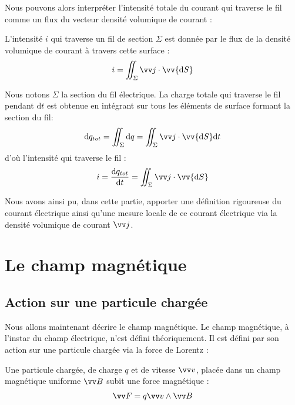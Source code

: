 \documentclass[11pt,fleqn]{book} %
\newcommand{\dd}{\mathrm{d}}
\begin{document}
Nous pouvons alors interpréter l'intensité totale du courant qui traverse le fil comme un flux du vecteur densité volumique de courant :

\begin{proposition}
    L'intensité $i$ qui traverse un fil de section $\Sigma$ est donnée par le flux de la densité volumique de courant à travers cette surface :
    \begin{equation}
        i = \iint_\Sigma \vv j \cdot \vv{\dd S}
    \end{equation}
\end{proposition}

\begin{demonstration}
    Nous notons $\Sigma$ la section du fil électrique. La charge totale qui traverse le fil pendant $\dd t$ est obtenue  en intégrant sur tous les éléments de surface formant la section du fil:
\begin{equation}
    \dd q_{tot} = \iint_\Sigma \dd q = \iint_\Sigma \vv j \cdot \vv{\dd S} \dd t
\end{equation}
d'où l'intensité qui traverse le fil :
\begin{equation}
    i = \frac{\dd q_{tot}}{\dd t} = \iint_\Sigma \vv j \cdot \vv{\dd S}
\end{equation}
\end{demonstration}

Nous avons ainsi pu, dans cette partie, apporter une définition rigoureuse du courant électrique ainsi qu'une mesure locale de ce courant électrique via la densité volumique de courant $\vv j$.

\section{Le champ magnétique}

\subsection{Action sur une particule chargée}

Nous allons maintenant décrire le champ magnétique. 
Le champ magnétique, à l'instar du champ électrique, n'est défini théoriquement. Il est défini par son action sur une particule chargée via la force de Lorentz :
\begin{proposition}
    Une particule chargée, de charge $q$ et de vitesse $\vv v$, placée dans un champ magnétique uniforme $\vv B$ subit une force magnétique :
    \begin{equation}
        \vv F = q \vv v \wedge \vv B
    \end{equation}
\end{proposition}
\end{document}
